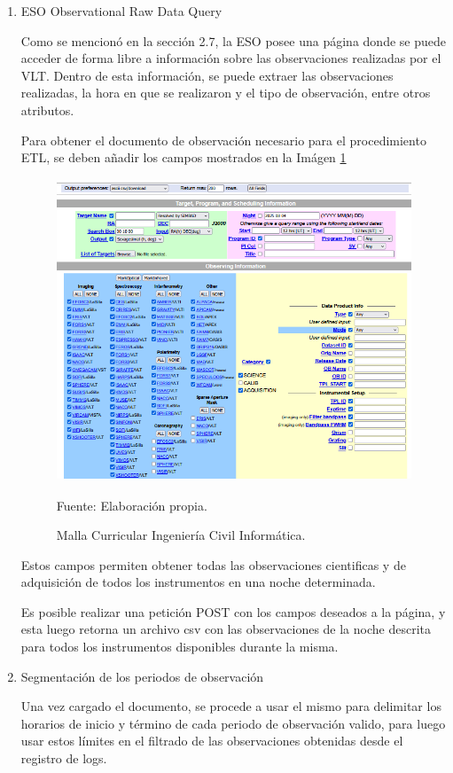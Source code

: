 \begin{enumerate}

    \item{ESO Observational Raw Data Query}
    
    Como se mencionó en la sección 2.7, la ESO posee una página donde se puede acceder de forma libre a información sobre las observaciones realizadas por el VLT. Dentro de esta información, se puede extraer las observaciones realizadas, la hora en que se realizaron y el tipo de observación, entre otros atributos.
    
    Para obtener el documento de observación necesario para el procedimiento ETL, se deben añadir los campos mostrados en la Imágen \ref{fig:eso_raw}

    \begin{figure}[h]
    \centering
    \includegraphics[width=13.5cm,height=9cm]{figures/eso_raw.png}
    \caption{\label{fig:eso_raw} Malla Curricular Ingeniería Civil Informática.} Fuente: Elaboración propia.
    \end{figure}
    
    Estos campos permiten obtener todas las observaciones cientificas y de adquisición de todos los instrumentos en una noche determinada.
    
    Es posible realizar una petición POST con los campos deseados a la página, y esta luego retorna un archivo csv con las observaciones de la noche descrita para todos los instrumentos disponibles durante la misma.

    \item{Segmentación de los periodos de observación}

    Una vez cargado el documento, se procede a usar el mismo para delimitar los horarios de inicio y término de cada periodo de observación valido, para luego usar estos límites en el filtrado de las observaciones obtenidas desde el registro de logs.


\end{enumerate}
